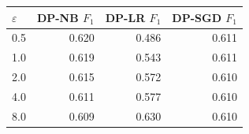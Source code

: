 \begin{tabular}{lrrr}
\toprule
$\varepsilon$ & DP-NB $F_1$ & DP-LR $F_1$ & DP-SGD $F_1$ \\
\midrule
0.5 & 0.620 & 0.486 & 0.611 \\
1.0 & 0.619 & 0.543 & 0.611 \\
2.0 & 0.615 & 0.572 & 0.610 \\
4.0 & 0.611 & 0.577 & 0.610 \\
8.0 & 0.609 & 0.630 & 0.610 \\
\bottomrule
\end{tabular}
